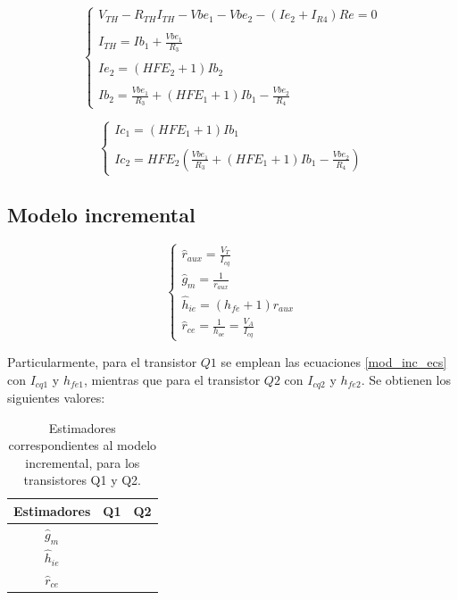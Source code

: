 	\begin{equation}
	\begin{cases}
		V_{TH} -  R_{TH} I_{TH} - Vbe_1 - Vbe_2 -(Ie_2 + I_{R4})Re = 0\\ \\
		I_{TH} = Ib_1 + \frac{Vbe_1}{R_3}\\ \\
		Ie_2 = (HFE_2 + 1)Ib_2\\ \\
		Ib_2 = \frac{Vbe_1}{R_3} + (HFE_1+1)Ib_1 - \frac{Vbe_2}{R_4}
		\end{cases}
	\end{equation}
	
		\begin{equation}
	\begin{cases}
	Ic_1 = (HFE_1 + 1)Ib_1\\ \\
	Ic_2 = HFE_2 (\frac{Vbe_1}{R_3} + (HFE_1 + 1)Ib_1 - \frac{Vbe_2}{R_4})
	\end{cases}
	\end{equation}
	

	\subsection{Modelo incremental}
	
		\begin{equation}
			\begin{cases}
			\widehat{r}_{aux} = \frac{V_T}{I_{cq}}\\
			\widehat{g}_m = \frac{1}{r_{aux}}\\	
			\widehat{h}_{ie} = (h_{fe} + 1) r_{aux}\\
			\widehat{r}_{ce} = \frac{1}{h_{oe}} = \frac{V_A}{I_{cq}}
			\end{cases}
			\label{mod_inc_ecs}
		\end{equation}
	
	Particularmente, para el transistor $Q1$ se emplean las ecuaciones \ref{mod_inc_ecs} con $I_{cq1}$ y $h_{fe1}$, mientras que para el transistor $Q2$ con $I_{cq2}$ y $h_{fe2}$. Se obtienen los siguientes valores:
	
	\begin{table}[h!]
		\centering
		\begin{tabular}{c c c}%
			\bfseries Estimadores & Q1 & Q2 \\ \hline
			$\widehat{g}_m$ &  & \\
			$\widehat{h}_{ie}$ &  & \\
			$\widehat{r}_{ce}$&  & \\
			\hline
		\end{tabular}
		\caption{Estimadores correspondientes al modelo incremental, para los transistores Q1 y Q2.}
		\label{avolf}
	\end{table}
	
